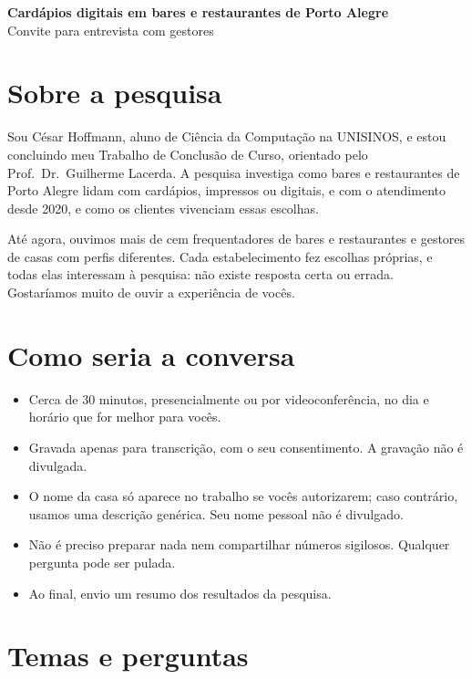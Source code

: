 \documentclass[11pt,a4paper]{article}
\begin{document}
\begin{center}
  {\Large\bfseries Cardápios digitais em bares e restaurantes de Porto Alegre}\\[0.3em]
  {\large Convite para entrevista com gestores}
\end{center}

\section*{\normalsize Sobre a pesquisa}

Sou César Hoffmann, aluno de Ciência da Computação na UNISINOS, e estou concluindo meu Trabalho de Conclusão de Curso, orientado pelo Prof.\ Dr.\ Guilherme Lacerda. A pesquisa investiga como bares e restaurantes de Porto Alegre lidam com cardápios, impressos ou digitais, e com o atendimento desde 2020, e como os clientes vivenciam essas escolhas.

Até agora, ouvimos mais de cem frequentadores de bares e restaurantes e gestores de casas com perfis diferentes. Cada estabelecimento fez escolhas próprias, e todas elas interessam à pesquisa: não existe resposta certa ou errada. Gostaríamos muito de ouvir a experiência de vocês.

\section*{\normalsize Como seria a conversa}

\begin{itemize}
  \item Cerca de 30 minutos, presencialmente ou por videoconferência, no dia e horário que for melhor para vocês.
  \item Gravada apenas para transcrição, com o seu consentimento. A gravação não é divulgada.
  \item O nome da casa só aparece no trabalho se vocês autorizarem; caso contrário, usamos uma descrição genérica. Seu nome pessoal não é divulgado.
  \item Não é preciso preparar nada nem compartilhar números sigilosos. Qualquer pergunta pode ser pulada.
  \item Ao final, envio um resumo dos resultados da pesquisa.
\end{itemize}

\section*{\normalsize Temas e perguntas}
\end{document}

